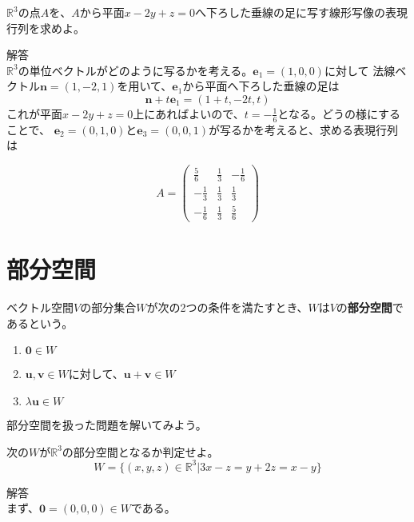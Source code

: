 \documentclass{jlreq}
\begin{document}
\begin{problem}
  $\mathbb{R}^3$の点$A$を、$A$から平面$x - 2y + z = 0$へ下ろした垂線の足に写す線形写像の表現行列を求めよ。
  \dotfill

  解答 \\
  $\mathbb{R}^3$の単位ベクトルがどのように写るかを考える。$\boldsymbol{e}_1 = (1, 0, 0)$に対して
  法線ベクトル$\boldsymbol{n} = (1, -2, 1)$を用いて、$\boldsymbol{e}_1$から平面へ下ろした垂線の足は
  \begin{equation*}
    \boldsymbol{n} + t \boldsymbol{e}_1 = (1 + t, -2t, t)
  \end{equation*}
  これが平面$x - 2y + z = 0$上にあればよいので、$t = -\frac{1}{6}$となる。どうの様にすることで、
  $\boldsymbol{e}_2 = (0, 1, 0)$と$\boldsymbol{e}_3 = (0, 0, 1)$が写るかを考えると、求める表現行列は

  \begin{equation*}
    A = \begin{pmatrix}
      \frac{5}{6} & \frac{1}{3} & -\frac{1}{6} \\
      -\frac{1}{3} & \frac{1}{3} & \frac{1}{3} \\
      -\frac{1}{6} & \frac{1}{3} & \frac{5}{6}
    \end{pmatrix}
  \end{equation*}
\end{problem}

\section{部分空間}
\begin{definitionbox}[部分空間]
  ベクトル空間$V$の部分集合$W$が次の2つの条件を満たすとき、$W$は$V$の\textbf{部分空間}であるという。

  \begin{enumerate}
    \item $\boldsymbol{0} \in W$
    \item $\boldsymbol{u}, \boldsymbol{v} \in W$に対して、$\boldsymbol{u} + \boldsymbol{v} \in W$
    \item $\lambda \boldsymbol{u} \in W$
  \end{enumerate}
\end{definitionbox}

部分空間を扱った問題を解いてみよう。

\begin{problem}
  次の$W$が$\mathbb{R}^3$の部分空間となるか判定せよ。
  \begin{equation*}
    W = \{ (x, y, z) \in \mathbb{R}^3 | 3x - z = y + 2z = x - y \}
  \end{equation*}

  \dotfill

  解答 \\
  まず、$\boldsymbol{0} = (0, 0, 0) \in W$である。
\end{problem}
\end{document}
